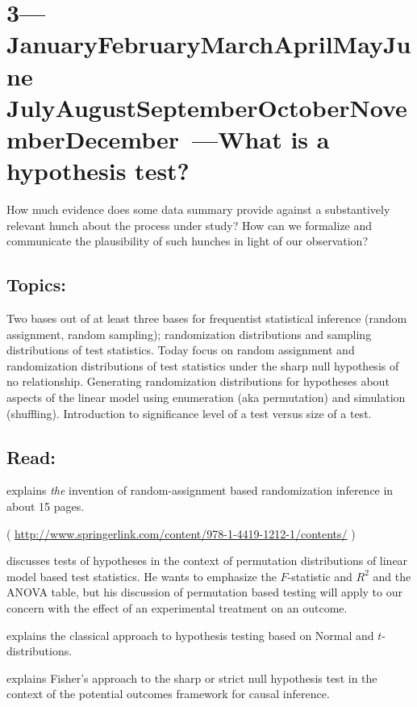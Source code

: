 \documentclass[10pt]{article}
\def\themonth{\ifcase\month\or
  January\or February\or March\or April\or May\or June\or
  July\or August\or September\or October\or November\or December\fi}
\begin{document}
\AdvanceDate[7]
\section{3---\themonth~\the\day---What is a hypothesis test?} %

How much evidence does some data summary provide against a
substantively relevant hunch about the process under study? How can we
formalize and communicate the plausibility of such hunches in light of our observation?

\subsection{Topics:} Two bases out of at least three bases for
frequentist statistical inference (random assignment, random
sampling); randomization distributions and sampling distributions of
test statistics. Today focus on random assignment and randomization
distributions of test statistics under the sharp null hypothesis of no
relationship. Generating randomization distributions for hypotheses
about aspects of the linear model using enumeration (aka permutation)
and simulation (shuffling). Introduction to significance level of a
test versus size of a test.

\subsection{Read:}

\citealp[Chap 2]{fisher:1935} explains \emph{the} invention of
random-assignment based randomization inference in about 15 pages.

\citealp[Chap 2]{rosenbaum2010design}  ( \url{http://www.springerlink.com/content/978-1-4419-1212-1/contents/} )

\citealp[Chap 15,16.1,16.6,16.7,17.5,17.7,17.8]{kaplan2009ism} discusses tests of hypotheses in the
context of permutation distributions of linear model based test
statistics. He wants to emphasize the $F$-statistic and $R^2$ and the
ANOVA table, but his discussion of permutation based testing will
apply to our concern with the effect of an experimental treatment on an outcome.

\citealp[Chap 8]{gonick1993cgs} explains the classical approach to
hypothesis testing based on Normal and $t$-distributions.

\citealp[Chap 5]{imbens2009causal} explains Fisher's approach to the
sharp or strict null hypothesis test in the context of the potential
outcomes framework for causal inference.
\end{document}
